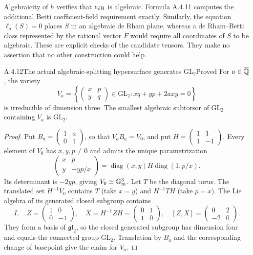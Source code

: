 Algebraicity of $h$ verifies that $e_{\mathrm{dR}}$ is algebraic. Formula A.4.11 computes the additional Betti coefficient-field requirement exactly. Similarly, the equation $\ell_a(S)=0$ places $S$ in an algebraic de Rham plane, whereas a de Rham--Betti class represented by the rational vector $F$ would require all coordinates of $S$ to be algebraic. These are explicit checks of the candidate tensors. They make no assertion that no other construction could help.

\begin{result}{A.4.12}{The actual algebraic-splitting hypersurface generates $\mathrm{GL}_2$}{Proved}
For $a\in\overline{\mathbb Q}$, the variety
\[
 V_a=\left\{\begin{pmatrix}x&p\\y&q\end{pmatrix}\in\mathrm{GL}_2:
 xq+yp+2axy=0\right\}
\]
is irreducible of dimension three. The smallest algebraic subtorsor of $\mathrm{GL}_2$ containing $V_a$ is $\mathrm{GL}_2$.
\end{result}
\begin{proof}
Put $B_a=\left(\begin{smallmatrix}1&a\\0&1\end{smallmatrix}\right)$, so that $V_aB_a=V_0$, and put $H=\left(\begin{smallmatrix}1&1\\1&-1\end{smallmatrix}\right)$. Every element of $V_0$ has $x,y,p\ne0$ and admits the unique parametrization
\[
 \begin{pmatrix}x&p\\y&-yp/x\end{pmatrix}
 =\operatorname{diag}(x,y)H\operatorname{diag}(1,p/x).
\]
Its determinant is $-2yp$, giving $V_0\simeq\mathbb G_m^3$. Let $T$ be the diagonal torus. The translated set $H^{-1}V_0$ contains $T$ (take $x=y$) and $H^{-1}TH$ (take $p=x$). The Lie algebra of its generated closed subgroup contains
\[
 I,\quad Z=\begin{pmatrix}1&0\\0&-1\end{pmatrix},\quad
 X=H^{-1}ZH=\begin{pmatrix}0&1\\1&0\end{pmatrix},\quad
 [Z,X]=\begin{pmatrix}0&2\\-2&0\end{pmatrix}.
\]
They form a basis of $\mathfrak{gl}_2$, so the closed generated subgroup has dimension four and equals the connected group $\mathrm{GL}_2$. Translation by $B_a$ and the corresponding change of basepoint give the claim for $V_a$.
\end{proof}

